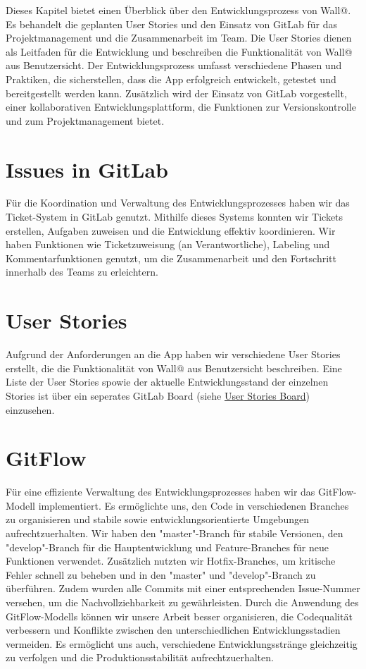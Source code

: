 
Dieses Kapitel bietet einen Überblick über den Entwicklungsprozess von Wall@. 
Es behandelt die geplanten User Stories und den Einsatz von GitLab für das Projektmanagement und die Zusammenarbeit im Team.
Die User Stories dienen als Leitfaden für die Entwicklung und beschreiben die Funktionalität von Wall@ aus Benutzersicht. 
Der Entwicklungsprozess umfasst verschiedene Phasen und Praktiken, die sicherstellen, dass die App erfolgreich entwickelt, getestet und bereitgestellt werden kann.
Zusätzlich wird der Einsatz von GitLab vorgestellt, einer kollaborativen Entwicklungsplattform, die Funktionen zur Versionskontrolle und zum Projektmanagement bietet.

\section{Issues in GitLab}
Für die Koordination und Verwaltung des Entwicklungsprozesses haben wir das Ticket-System in GitLab genutzt. 
Mithilfe dieses Systems konnten wir Tickets erstellen, Aufgaben zuweisen und die Entwicklung effektiv koordinieren. 
Wir haben Funktionen wie Ticketzuweisung (an Verantwortliche), Labeling und Kommentarfunktionen genutzt, 
um die Zusammenarbeit und den Fortschritt innerhalb des Teams zu erleichtern.

\section{User Stories}
Aufgrund der Anforderungen an die App haben wir verschiedene User Stories erstellt, 
die die Funktionalität von Wall@ aus Benutzersicht beschreiben.
Eine Liste der User Stories spowie der aktuelle Entwicklungsstand der einzelnen Stories ist über ein 
seperates GitLab Board (siehe \href{https://gitlab.in.htwg-konstanz.de/mobile-anwendungen-ss23/gruppen/gruppe-4/-/boards/272}{User Stories Board}) einzusehen.

\section{GitFlow}
Für eine effiziente Verwaltung des Entwicklungsprozesses haben wir das GitFlow-Modell implementiert. 
Es ermöglichte uns, den Code in verschiedenen Branches zu organisieren und stabile sowie entwicklungsorientierte Umgebungen aufrechtzuerhalten. 
Wir haben den "master"-Branch für stabile Versionen, den "develop"-Branch für die Hauptentwicklung und Feature-Branches für neue 
Funktionen verwendet. Zusätzlich nutzten wir Hotfix-Branches, um kritische Fehler schnell zu beheben und in den "master" und 
"develop"-Branch zu überführen. Zudem wurden alle Commits mit einer entsprechenden Issue-Nummer versehen, 
um die Nachvollziehbarkeit zu gewährleisten.
\newline
\newline
Durch die Anwendung des GitFlow-Modells können wir unsere Arbeit besser organisieren, 
die Codequalität verbessern und Konflikte zwischen den unterschiedlichen Entwicklungsstadien vermeiden. 
Es ermöglicht uns auch, verschiedene Entwicklungsstränge gleichzeitig zu verfolgen und die Produktionsstabilität aufrechtzuerhalten.
